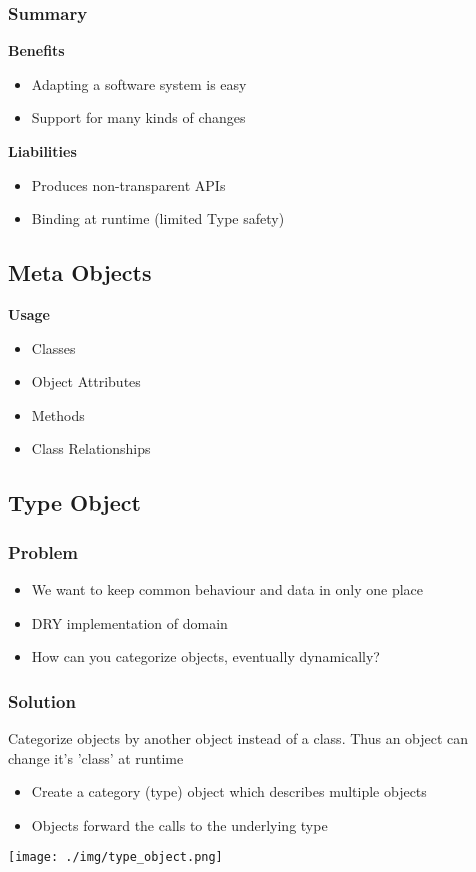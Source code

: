 \subsubsection{Summary}
\textbf{Benefits}
\begin{itemize}
    \item Adapting a software system is easy
    \item Support for many kinds of changes
\end{itemize}
\textbf{Liabilities}
\begin{itemize}
    \item Produces non-transparent APIs
    \item Binding at runtime (limited Type safety)
\end{itemize}

\subsection{Meta Objects}
\textbf{Usage}
\begin{itemize}
    \item Classes
    \item Object Attributes
    \item Methods
    \item Class Relationships
\end{itemize}

\subsection{Type Object}
\subsubsection{Problem}
\begin{itemize}
    \item We want to keep common behaviour and data in only one place
    \item DRY implementation of domain
    \item How can you categorize objects, eventually dynamically?
\end{itemize}
\subsubsection{Solution}
Categorize objects by another object instead of a class. Thus an object can change it's 'class' at runtime
\begin{itemize}
    \item Create a category (type) object which describes multiple objects
    \item Objects forward the calls to the underlying type
\end{itemize}
\texttt{[image: ./img/type\_object.png]}
